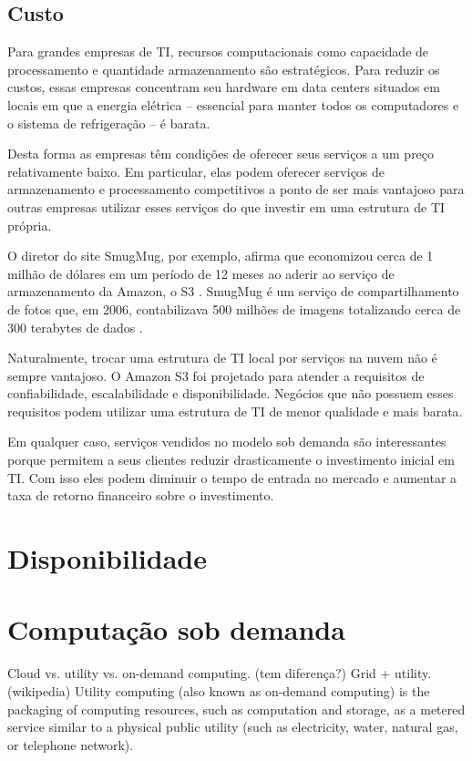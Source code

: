\subsection{Custo}

Para grandes empresas de TI, recursos computacionais como capacidade de processamento e quantidade armazenamento são estratégicos. Para reduzir os custos, essas empresas concentram seu hardware em data centers situados em locais em que a energia elétrica -- essencial para manter todos os computadores e o sistema de refrigeração -- é barata.

Desta forma as empresas têm condições de oferecer seus serviços a um preço relativamente baixo. Em particular, elas podem oferecer serviços de armazenamento e processamento competitivos a ponto de ser mais vantajoso para outras empresas utilizar esses serviços do que investir em uma estrutura de TI própria.

O diretor do site SmugMug, por exemplo, afirma que economizou cerca de 1 milhão de dólares em um período de 12 meses ao aderir ao serviço de armazenamento da Amazon, o S3 \cite{http://blogs.smugmug.com/don/2006/11/10/amazon-s3-show-me-the-money/}. SmugMug é um serviço de compartilhamento de fotos que, em 2006, contabilizava 500 milhões de imagens totalizando cerca de 300 terabytes de dados \cite{http://blogs.smugmug.com/don/2006/08/12/amazon-s3-the-holy-grail/}.

Naturalmente, trocar uma estrutura de TI local por serviços na nuvem não é sempre vantajoso. O Amazon S3 foi projetado para atender a requisitos de confiabilidade, escalabilidade e disponibilidade. Negócios que não possuem esses requisitos podem utilizar uma estrutura de TI de menor qualidade e mais barata.

Em qualquer caso, serviços vendidos no modelo sob demanda são interessantes porque permitem a seus clientes reduzir drasticamente o investimento inicial em TI. Com isso eles podem diminuir o tempo de entrada no mercado e aumentar a taxa de retorno financeiro sobre o investimento.

\section{Disponibilidade}





\section{Computação sob demanda}

        Cloud vs. utility vs. on-demand computing. (tem diferença?) Grid + utility.
          (wikipedia) Utility computing (also known as on-demand computing) is the packaging of computing resources, such as computation and storage, as a metered service similar to a physical public utility (such as electricity, water, natural gas, or telephone network).

